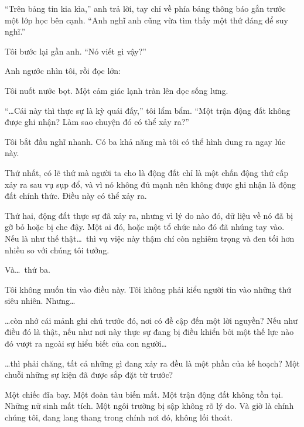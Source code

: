 \documentclass[../main.tex]{subfiles}
\begin{document}
``Trên bảng tin kia kìa,'' anh trả lời, tay chỉ về phía bảng thông báo gắn trước một lớp học bên cạnh. ``Anh nghĩ anh cũng vừa tìm thấy một thứ đáng để suy nghĩ.''

Tôi bước lại gần anh. ``Nó viết gì vậy?''

Anh ngước nhìn tôi, rồi đọc lớn:


Tôi nuốt nước bọt. Một cảm giác lạnh tràn lên dọc sống lưng.

``\dots Cái này thì thực sự là kỳ quái đấy,'' tôi lẩm bẩm. ``Một trận động đất không được ghi nhận? Làm sao chuyện đó có thể xảy ra?''

Tôi bắt đầu nghĩ nhanh. Có ba khả năng mà tôi có thể hình dung ra ngay lúc này.

Thứ nhất, có lẽ thứ mà người ta cho là động đất chỉ là một chấn động thứ cấp xảy ra sau vụ sụp đổ, và vì nó không đủ mạnh nên không được ghi nhận là động đất chính thức. Điều này có thể xảy ra.

Thứ hai, động đất thực sự đã xảy ra, nhưng vì lý do nào đó, dữ liệu về nó đã bị gỡ bỏ hoặc bị che đậy. Một ai đó, hoặc một tổ chức nào đó đã nhúng tay vào. Nếu là như thế thật\dots\ thì vụ việc này thậm chí còn nghiêm trọng và đen tối hơn nhiều so với chúng tôi tưởng.

Và\dots\ thứ ba.

Tôi không muốn tin vào điều này. Tôi không phải kiểu người tin vào những thứ siêu nhiên. Nhưng\dots

\dots còn nhớ cái mảnh ghi chú trước đó, nơi có đề cập đến một lời nguyền? Nếu như điều đó là thật, nếu như nơi này thực sự đang bị điều khiển bởi một thế lực nào đó vượt ra ngoài sự hiểu biết của con người\dots

\dots thì phải chăng, tất cả những gì đang xảy ra đều là một phần của kế hoạch? Một chuỗi những sự kiện đã được sắp đặt từ trước?

Một chiếc đĩa bay. Một đoàn tàu biến mất. Một trận động đất không tồn tại. Những nữ sinh mất tích. Một ngôi trường bị sập không rõ lý do. Và giờ là chính chúng tôi, đang lang thang trong chính nơi đó, không lối thoát.
\end{document}
